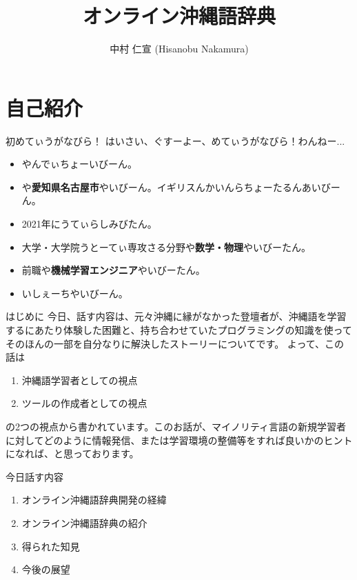\documentclass[14pt]{beamer}
\title{オンライン沖縄語辞典}
\author{中村 仁宣 (Hisanobu Nakamura)}
\begin{document}
\begin{frame}
  \maketitle  
\end{frame}

\section{自己紹介}

\begin{frame}{初めてぃうがなびら！}
  はいさい、ぐすーよー、めてぃうがなびら！わんねー...
    \begin{itemize}
    \item {}や\textbf{}んでぃちょーいびーん。
    \item {}や\textbf{愛知県名古屋市}やいびーん。イギリスんかいんらちょーたるんあいびーん。
    \item 2021年にうてぃらしみびたん。
    \item 大学・大学院うとーてぃ専攻さる分野や\textbf{数学・物理}やいびーたん。
    \item 前職や\textbf{機械学習エンジニア}やいびーたん。
    \item {}いしぇーちやいびーん。
    \end{itemize}
\end{frame}

\begin{frame}{はじめに}
  今日、話す内容は、元々沖縄に縁がなかった登壇者が、沖縄語を学習するにあたり体験した困難と、持ち合わせていたプログラミングの知識を使ってそのほんの一部を自分なりに解決したストーリーについてです。
  よって、この話は
  \begin{enumerate}
  \item {}沖縄語学習者としての視点
  \item ツールの作成者としての視点
  \end{enumerate}
  の2つの視点から書かれています。このお話が、マイノリティ言語の新規学習者に対してどのように情報発信、または学習環境の整備等をすれば良いかのヒントになれば、と思っております。
\end{frame}

\begin{frame}{今日話す内容}
  \begin{enumerate}
  \item オンライン沖縄語辞典開発の経緯
  \item オンライン沖縄語辞典の紹介
  \item 得られた知見
  \item 今後の展望
  \end{enumerate}
\end{frame}
\end{document}
